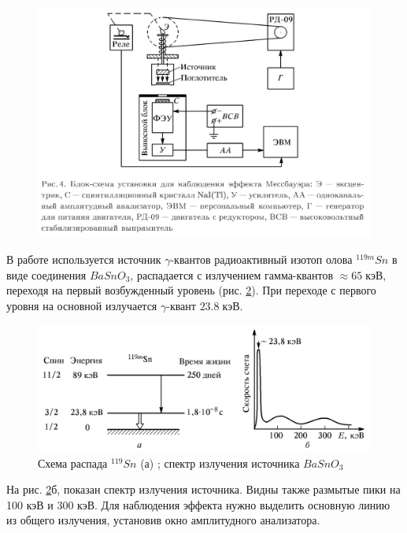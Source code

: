 \documentclass[a4paper]{article}
\begin{document}
\begin{figure}[H]
    \begin{center}
        \includegraphics[scale = 0.5]{setup.png}
        \caption{}
        \label{setup}
    \end{center}
\end{figure}

В работе используется источник $\gamma$-квантов радиоактивный изотоп олова $^{119m}Sn$ в 
виде соединения $BaSnO_3$, распадается с излучением гамма-квантов $\approx 65\; кэВ$, переходя 
на первый возбужденный уровень (рис. \ref{p4}). При переходе с первого уровня на основной излучается $\gamma$-квант 
$23.8 \; кэВ$. 


\begin{figure}[h]
    \begin{center}
        \includegraphics[scale = 0.5]{p4.png}
        \caption{Схема распада $^{119}Sn$ (а) ; спектр излучения источника $BaSnO_3$}
        \label{p4}
    \end{center}
\end{figure}

На рис. \ref{p4}б, показан спектр излучения источника. Видны также размытые пики на 100 кэВ и 300 кэВ. Для наблюдения эффекта 
нужно выделить основную линию из общего излучения, установив окно амплитудного анализатора. 
\end{document}
